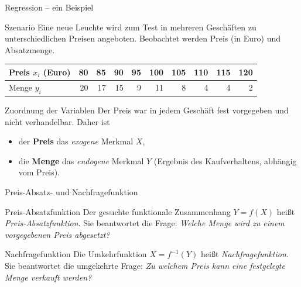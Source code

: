 \documentclass[aspectratio=169,11pt]{beamer}
\begin{document}



\begin{frame}{Regression -- ein Beispiel}
  \begin{block}{Szenario}
    Eine neue Leuchte wird zum Test in mehreren Geschäften zu
    unterschiedlichen Preisen angeboten. Beobachtet werden Preis
    (in Euro) und Absatzmenge.
  \end{block}

  \medskip

  \begin{center}
    \begin{tabular}{l*{9}{r}}
      \toprule
      Preis $x_i$ (Euro)  & 80 & 85 & 90 & 95 & 100 & 105 & 110 & 115 & 120 \\
      \midrule
      Menge $y_i$         & 20 & 17 & 15 & 9  & 11  & 8   & 4   & 4   & 2   \\
      \bottomrule
    \end{tabular}
  \end{center}

  \medskip

  \begin{exampleblock}{Zuordnung der Variablen}
    Der Preis war in jedem Geschäft fest vorgegeben und nicht verhandelbar.
    Daher ist
    \begin{itemize}
      \item der \textbf{Preis} das \emph{exogene} Merkmal $X$,
      \item die \textbf{Menge} das \emph{endogene} Merkmal $Y$
            (Ergebnis des Kaufverhaltens, abhängig vom Preis).
    \end{itemize}
  \end{exampleblock}
\end{frame}


\begin{frame}{Preis-Absatz- und Nachfragefunktion}
  \begin{block}{Preis-Absatzfunktion}
    Der gesuchte funktionale Zusammenhang $Y = f(X)$ heißt
    \emph{Preis-Absatzfunktion}. Sie beantwortet die Frage:
    \emph{Welche Menge wird zu einem vorgegebenen Preis abgesetzt?}
  \end{block}

  \medskip

  \begin{block}{Nachfragefunktion}
    Die Umkehrfunktion $X = f^{-1}(Y)$ heißt \emph{Nachfragefunktion}.
    Sie beantwortet die umgekehrte Frage: \emph{Zu welchem Preis kann
    eine festgelegte Menge verkauft werden?}
  \end{block}

  \end{frame}
\end{document}

